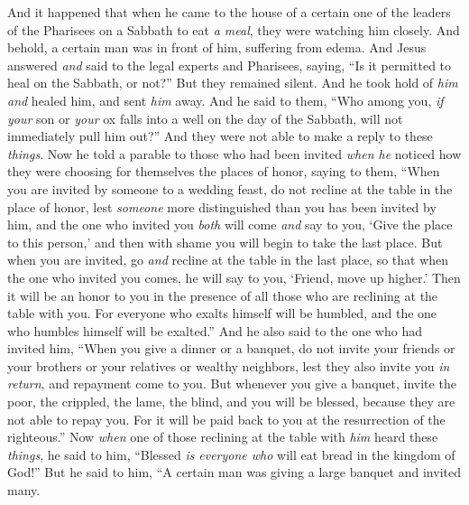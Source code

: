 \begin{biblechapter} %
 And it happened that when he came to the house of a certain one of the leaders of the Pharisees on a Sabbath to eat \textit{a meal}, they were watching him closely.
\verse And behold, a certain man was in front of him, suffering from edema.
\verse And Jesus answered \textit{and} said to the legal experts and Pharisees, saying, “Is it permitted to heal on the Sabbath, or not?”
\verse But they remained silent. And he took hold of \textit{him} \textit{and} healed him, and sent \textit{him} away.
\verse And he said to them, “Who among you, \textit{if your} son or \textit{your} ox falls into a well on the day of the Sabbath, will not immediately pull him out?”
\verse And they were not able to make a reply to these \textit{things}.
 Now he told a parable to those who had been invited \textit{when he} noticed how they were choosing for themselves the places of honor, saying to them,
\verse “When you are invited by someone to a wedding feast, do not recline at the table in the place of honor, lest \textit{someone} more distinguished than you has been invited by him,
\verse and the one who invited you \textit{both} will come \textit{and} say to you, ‘Give the place to this person,’ and then with shame you will begin to take the last place.
\verse But when you are invited, go \textit{and} recline at the table in the last place, so that when the one who invited you comes, he will say to you, ‘Friend, move up higher.’ Then it will be an honor to you in the presence of all those who are reclining at the table with you.
\verse For everyone who exalts himself will be humbled, and the one who humbles himself will be exalted.”
 And he also said to the one who had invited him, “When you give a dinner or a banquet, do not invite your friends or your brothers or your relatives or wealthy neighbors, lest they also invite you \textit{in return}, and repayment come to you.
\verse But whenever you give a banquet, invite the poor, the crippled, the lame, the blind,
\verse and you will be blessed, because they are not able to repay you. For it will be paid back to you at the resurrection of the righteous.”
\verse Now \textit{when} one of those reclining at the table with \textit{him} heard these \textit{things}, he said to him, “Blessed \textit{is} \textit{everyone who} will eat bread in the kingdom of God!”
\verse But he said to him, “A certain man was giving a large banquet and invited many.

\end{biblechapter}
